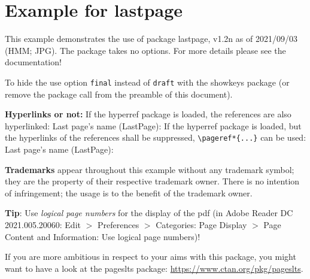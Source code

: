 \documentclass[british]{article}[2014/09/29]%
\begin{document}

\section*{Example for lastpage}

This example demonstrates the use of package\newline
\textsf{lastpage}, v1.2n as of 2021/09/03 (HMM; JPG).\newline
The package takes no options.\newline
For more details please see the documentation!\newline

\noindent \label{keys} To hide the \pageref{keys}{\qquad } use option
\texttt{final} instead of \texttt{draft} with the \textsf{showkeys}
package (or remove the package call from the preamble of
this document).\newline

\textbf{Hyperlinks or not:} If the \textsf{hyperref} package is loaded,
the references are also hyperlinked:\newline
\smallskip
Last page's name (LastPage): \pageref{LastPage}\newline
\noindent If the \textsf{hyperref} package is loaded, but the hyperlinks
of the references shall be suppressed, \verb|\pageref*{...}|
can be used:\newline
\smallskip
Last page's name (LastPage): \pageref*{LastPage}\newline

\textbf{Trademarks} appear throughout this example without any
trademark symbol; they are the property of their respective
trademark owner. There is no intention of infringement; the
usage is to the benefit of the trademark owner.\newline

\textbf{Tip}: Use \textit{logical page numbers}
for the display of the pdf (in Adobe Reader DC 2021.005.20060:
Edit $>$ Preferences $>$ Categories: Page Display $>$
Page Content and Information: Use logical page numbers)!\newline

If you are more ambitious in respect to your aims with this package,
you might want to have a look at the \textsf{pageslts} package:\newline
\url{https://www.ctan.org/pkg/pageslts}.

\bigskip
\end{document}
